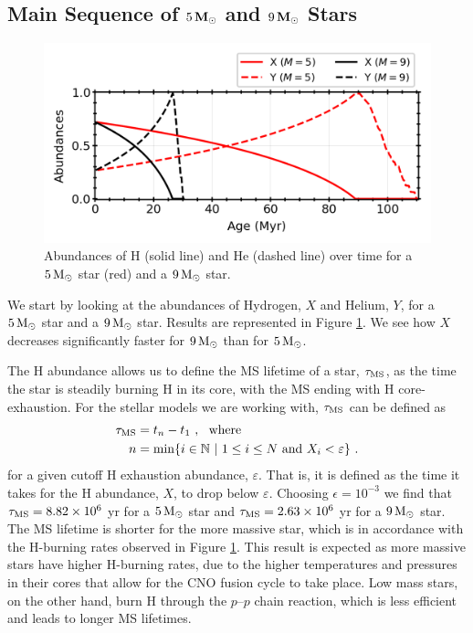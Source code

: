 \subsection{Main Sequence of $5 \, {\rm \textbf{M}}_\odot$ and $9 \,{\rm \textbf{M}}_\odot$ Stars}
\begin{figure}[!ht]
    \centering
    \includegraphics[width=1.0\columnwidth]{../figures/abundances.png}  %
    \caption{\small Abundances of H (solid line) and He (dashed line) over time for a $5 \, {\rm M}_\odot$ star (red) and a $9\, {\rm M}_\odot$ star.}
    \label{fig:abundances}
\end{figure}
We start by looking at the abundances of Hydrogen, $X$ and Helium, $Y$, for a $5 \, {\rm M}_\odot$ star and a $9 \, {\rm M}_\odot$ star. Results are represented in Figure \ref{fig:abundances}. We see how $X$ decreases significantly faster for $ 9 \,{\rm M}_\odot$ than for $5 \,{\rm M}_\odot$.

The H abundance allows us to define the MS lifetime of a star, $\tau_{\rm MS}$, as the time the star is steadily burning H in its core, with the MS ending with H core-exhaustion.
For the stellar models we are working with, $\tau_{\rm MS}$ can be defined as
\begin{align}
    \tau_{\rm MS} & = t_n - t_1 \ , \ \ {\rm where}                                                              \notag              \\
    n             & = {\rm min}\{i\in \mathbb{N} \ | \  1 \leq i \leq N \ {\rm and} \ X_i < \varepsilon\} \ . \label{eq:MS_lifetime}
\end{align}
for a given cutoff H exhaustion abundance, $\varepsilon$. That is, it is defined as the time it takes for the H abundance,
$X$, to drop below $\varepsilon$. Choosing $\epsilon = 10^{-3}$ we find that $\tau_{\rm MS} = 8.82 \times 10^6$ yr for a $5 \, {\rm M}_\odot$ star and $\tau_{\rm MS} = 2.63 \times 10^6$ yr for a $9 \, {\rm M}_\odot$ star. The MS lifetime is shorter for the more massive star, which is in accordance with the H-burning rates observed in Figure \ref{fig:abundances}. This result is expected as more massive stars have higher H-burning rates, due to the higher temperatures and pressures in their cores that allow for the CNO fusion cycle to take place. Low mass stars, on the other hand, burn H through the $p\text{--}p$ chain reaction, which is less efficient and leads to longer MS lifetimes.


